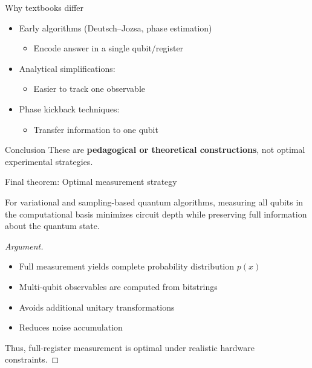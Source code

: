 \documentclass[aspectratio=169]{beamer}
\begin{document}
\begin{frame}{Why textbooks differ}
\begin{itemize}
\item Early algorithms (Deutsch–Jozsa, phase estimation)
\begin{itemize}
\item Encode answer in a single qubit/register
\end{itemize}

\item Analytical simplifications:
\begin{itemize}
\item Easier to track one observable
\end{itemize}

\item Phase kickback techniques:
\begin{itemize}
\item Transfer information to one qubit
\end{itemize}
\end{itemize}

\medskip

\begin{block}{Conclusion}
These are \textbf{pedagogical or theoretical constructions}, not optimal experimental strategies.
\end{block}
\end{frame}


\begin{frame}{Final theorem: Optimal measurement strategy}
\begin{theorem}
For variational and sampling-based quantum algorithms, measuring all qubits in the computational basis minimizes circuit depth while preserving full information about the quantum state.
\end{theorem}

\begin{proof}[Argument]
\begin{itemize}
\item Full measurement yields complete probability distribution $p(x)$
\item Multi-qubit observables are computed from bitstrings
\item Avoids additional unitary transformations
\item Reduces noise accumulation
\end{itemize}

Thus, full-register measurement is optimal under realistic hardware constraints.
\end{proof}
\end{frame}
\end{document}
